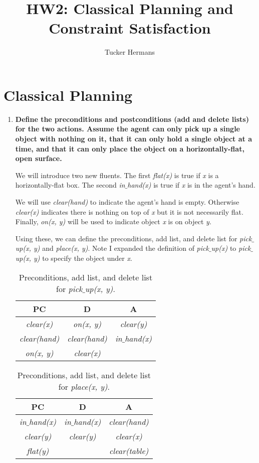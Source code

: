\documentclass[11pt, letterpaper]{hw}
\title{HW2: Classical Planning and Constraint Satisfaction}
\institute{University of Utah}
\author{Tucker Hermans}
\begin{document}
\maketitle
\section{Classical Planning}
\begin{enumerate}
\item \textbf{Define the preconditions and postconditions (add and delete lists) for the two actions. Assume the agent can only pick up a single object with nothing on it, that it can only hold a single object at a time, and that it can only place the object on a horizontally-flat, open surface.}

We will introduce two new fluents. The first \textit{flat(x)} is true if \textit{x} is a horizontally-flat box. The second \textit{in$\_$hand(x)} is true if \textit{x} is in the agent's hand. 

We will use \textit{clear(hand)} to indicate the agent's hand is empty. Otherwise \textit{clear(x)} indicates there is nothing on top of \textit{x} but it is not necessarily flat. Finally, \textit{on(x, y)} will be used to indicate object \textit{x} is on object \textit{y}.

Using these, we can define the preconditions, add list, and delete list for \textit{pick$\_$up(x, y)} and \textit{place(x, y)}. Note I expanded the definition of \textit{pick$\_$up(x)} to \textit{pick$\_$up(x, y)} to specify the object under \textit{x}.

\begin{table}[H]
\centering
{\renewcommand{\arraystretch}{1.2}%
\begin{tabular}{| c | c | c |}
\hline
\textbf{PC} & \textbf{D} & \textbf{A}\\
\hline
\textit{clear(x)} & \textit{on(x, y)} & \textit{clear(y)}\\ \hline
\textit{clear(hand)} & \textit{clear(hand)} & \textit{in$\_$hand(x)}\\ \hline
\textit{on(x, y)} & \textit{clear(x)} &  \\ \hline
\end{tabular}}
\caption{Preconditions, add list, and delete list for \textit{pick$\_$up(x, y)}.}
\end{table}

\begin{table}[H]
\centering
{\renewcommand{\arraystretch}{1.2}%
\begin{tabular}{| c | c | c |}
\hline
\textbf{PC} & \textbf{D} & \textbf{A}\\
\hline
\textit{in$\_$hand(x)} & \textit{in$\_$hand(x)} & \textit{clear(hand)}\\ \hline
\textit{clear(y)} & \textit{clear(y)} & \textit{clear(x)}\\ \hline
\textit{flat(y)} &  & \textit{clear(table)} \\ \hline
\end{tabular}}
\caption{Preconditions, add list, and delete list for \textit{place(x, y)}.}
\end{table}


\end{enumerate}
\end{document}
